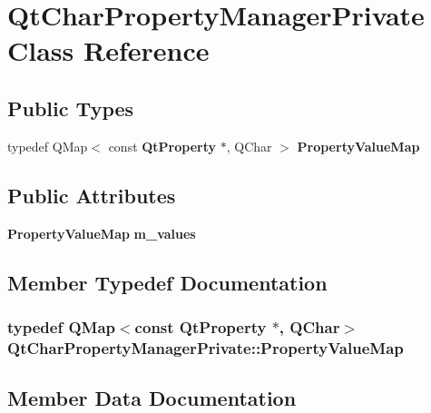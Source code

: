 \section{Qt\+Char\+Property\+Manager\+Private Class Reference}
\label{classQtCharPropertyManagerPrivate}
\subsection*{Public Types}
\begin{DoxyCompactItemize}
\item 
typedef Q\+Map$<$ const {\bf Qt\+Property} $\ast$, Q\+Char $>$ {\bf Property\+Value\+Map}
\end{DoxyCompactItemize}
\subsection*{Public Attributes}
\begin{DoxyCompactItemize}
\item 
{\bf Property\+Value\+Map} {\bf m\+\_\+values}
\end{DoxyCompactItemize}


\subsection{Member Typedef Documentation}
\subsubsection[{Property\+Value\+Map}]{\setlength{\rightskip}{0pt plus 5cm}typedef Q\+Map$<$const {\bf Qt\+Property} $\ast$, Q\+Char$>$ {\bf Qt\+Char\+Property\+Manager\+Private\+::\+Property\+Value\+Map}}\label{classQtCharPropertyManagerPrivate_a4bb65abab9a67388afee77cd222c62d2}


\subsection{Member Data Documentation}
